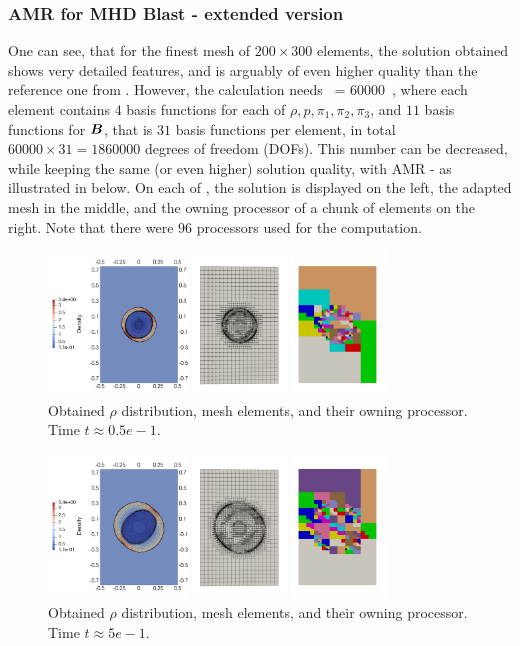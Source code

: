 \subsubsection{AMR for MHD Blast - extended version}
One can see, that for the finest mesh of $200\times300$ elements, the solution obtained shows very detailed features, and is arguably of even higher quality than the reference one from \cite{blastNew1}. However, the calculation needs
 \ = 60000\ ,
\ee
where each element contains $4$ basis functions for each of $\rho, p, \pi_1, \pi_2, \pi_3$, and $11$ basis functions for $\mbox{\boldmath $B$}$, that is $31$ basis functions per element, in total $60000 \times 31 = 1860000$ degrees of freedom (DOFs). This number can be decreased, while keeping the same (or even higher) solution quality, with AMR - as illustrated in  below. On each of , the solution is displayed on the left, the adapted mesh in the middle, and the owning processor of a chunk of elements on the right. Note that there were $96$ processors used for the computation.

\begin{figure}[H]
	\begin{center}
		\includegraphics[width=0.8\textwidth]{img/mhd-blast/new/adapt-full0.jpg}
	\caption{Obtained $\rho$ distribution, mesh elements, and their owning processor. Time $t\approx 0.5e-1$.}
	\label{figure:amrBlast1}
	\end{center}
\end{figure}
\vspace{-4mm}

\begin{figure}[H]
	\begin{center}
		\includegraphics[width=0.8\textwidth]{img/mhd-blast/new/adapt-full1.jpg}
	\caption{Obtained $\rho$ distribution, mesh elements, and their owning processor. Time $t\approx 5e-1$.}
	\label{figure:amrBlast2}
	\end{center}
\end{figure}
\vspace{-4mm}

